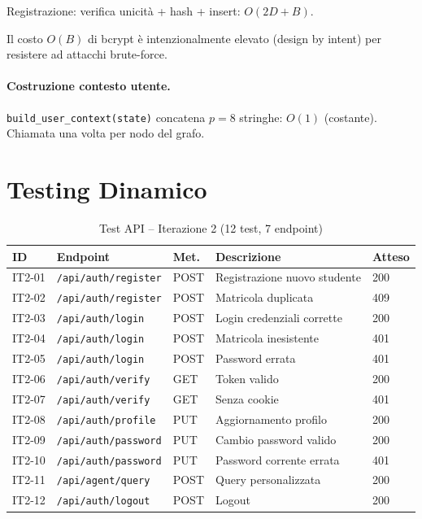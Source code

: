 \documentclass[a4paper,12pt]{report}
\begin{document}
Registrazione: verifica unicità + hash + insert: $O(2D + B)$.

Il costo $O(B)$ di bcrypt è intenzionalmente elevato (design by intent) per resistere ad attacchi brute-force.

\paragraph{Costruzione contesto utente.}
\texttt{build\_user\_context(state)} concatena $p=8$ stringhe: $O(1)$ (costante). Chiamata una volta per nodo del grafo.

\section{Testing Dinamico}

\begin{table}[H]
\centering
\small
\begin{tabularx}{\textwidth}{l l l X l}
\toprule
\textbf{ID} & \textbf{Endpoint} & \textbf{Met.} & \textbf{Descrizione} & \textbf{Atteso} \\
\midrule
IT2-01 & \texttt{/api/auth/register} & POST & Registrazione nuovo studente & 200 \\
IT2-02 & \texttt{/api/auth/register} & POST & Matricola duplicata & 409 \\
IT2-03 & \texttt{/api/auth/login} & POST & Login credenziali corrette & 200 \\
IT2-04 & \texttt{/api/auth/login} & POST & Matricola inesistente & 401 \\
IT2-05 & \texttt{/api/auth/login} & POST & Password errata & 401 \\
IT2-06 & \texttt{/api/auth/verify} & GET & Token valido & 200 \\
IT2-07 & \texttt{/api/auth/verify} & GET & Senza cookie & 401 \\
IT2-08 & \texttt{/api/auth/profile} & PUT & Aggiornamento profilo & 200 \\
IT2-09 & \texttt{/api/auth/password} & PUT & Cambio password valido & 200 \\
IT2-10 & \texttt{/api/auth/password} & PUT & Password corrente errata & 401 \\
IT2-11 & \texttt{/api/agent/query} & POST & Query personalizzata & 200 \\
IT2-12 & \texttt{/api/auth/logout} & POST & Logout & 200 \\
\bottomrule
\end{tabularx}
\caption{Test API -- Iterazione 2 (12 test, 7 endpoint)}
\end{table}
\end{document}
